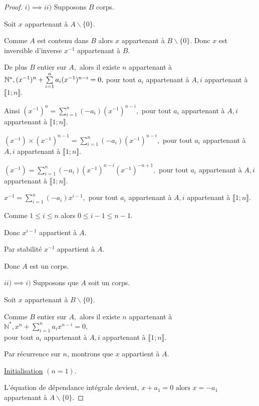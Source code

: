 \begin{proof}
	$i)\implies ii)$ Supposons $B$ corps.
	
	Soit $x$ appartenant à $ A\backslash \{0\}.$
	
	Comme $A$ est contenu dans $ B$ alors $x$ appartenant à $ B\backslash \{0\}$. Donc $x$ est inversible d'inverse $x^{-1}$ appartenant à $ B.$
	
	De plus $B$ entier sur $A,$ alors il existe $n$ appartenant à $ \mathbb{N}^{\ast }, \\ (x^{-1})^{n}+\sum\limits_{i=1}^{n}a_{i}(x^{-1})^{n-i}=0,$ pour tout 
	$a_{i}$ appartenant à $ A,i$ appartenant à $ \llbracket 1; n \rrbracket.$
	
	Ainsi $(x^{-1})^{n}=\sum\limits_{i=1}^{n}(-a_{i})(x^{-1})^{n-i},$ pour tout $
	a_{i}$ appartenant à $ A,i$ appartenant à $ \llbracket 1; n \rrbracket.$
	
	$(x^{-1})\times (x^{-1})^{n-1}=\sum\limits_{i=1}^{n}(-a_{i})(x^{-1})^{n-i},$
	pour tout $a_{i}$ appartenant à $ A,i$ appartenant à $ \llbracket 1; n \rrbracket.$
	
	$(x^{-1})=\sum\limits_{i=1}^{n}(-a_{i})(x^{-1})^{n-i}(x^{-1})^{-n+1},$ pour
	tout $a_{i}$ appartenant à $ A,i$ appartenant à $ \llbracket 1; n \rrbracket.$
	
	$x^{-1}=\sum\limits_{i=1}^{n}(-a_{i})x^{i-1},$ pour tout $a_{i}$ appartenant à $ A,i$ appartenant à $
	\llbracket 1; n \rrbracket.$
	
	Comme $1\leq i\leq n$ alors $0\leq i-1\leq n-1$.
	
	Donc $x^{i-1}$ appartient à $ A$.
	
	Par stabilité $x^{-1}$ appartient à $ A$.
	
	Donc $A$ est un corps.
	
	$ii)\implies i)$ Supposons que $A$ soit un corps.
	
	Soit $x$ appartenant à $ B\backslash \{0\}.$
	
	Comme $B$ entier sur $A,$ alors il existe $n$ appartenant à $ \mathbb{N}^{\ast },x^{n}+\sum\limits_{i=1}^{n}a_{i}x^{n-i}=0,$\\ pour tout $a_{i}$ appartenant à $
	A,i$ appartenant à $ \llbracket 1; n \rrbracket.$

	Par récurrence sur $n$, montrons que $x$ appartient à $ A.$
	
	\underline{Initialisation} $(n=1)$.
	
	L'équation de dépendance intégrale devient, $x+a_{1}=0
	\text{ alors } x=-a_{1}$ appartenant à $ A\backslash \{0\}.$
	

\end{proof}

